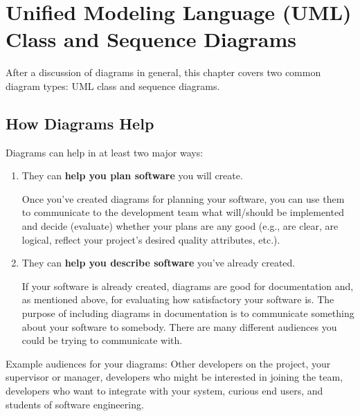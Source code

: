 \yesmargins
\chapter{Unified Modeling Language (UML) Class and Sequence Diagrams}



After a discussion of diagrams in general, this chapter covers two common diagram types: UML class and sequence diagrams.

\section{How Diagrams Help}

Diagrams can help in at least two major ways:

\begin{enumerate}
\item {
They can \textbf{help you plan software} you will create.

Once you've created diagrams for planning your software, you can use them to communicate to the development team what will/should be implemented and decide (evaluate) whether your plans are any good (e.g., are clear, are logical, reflect your project's desired quality attributes, etc.).
}
\item {
They can \textbf{help you describe software} you've already created.

\marginpar{\classDiagramDef\margindivider}\marginpar{\sequenceDiagramDef}If your software is already created, diagrams are good for documentation and, as mentioned above, for evaluating how satisfactory your software is.  The purpose of including diagrams in documentation is to communicate something about your software to somebody. There are many different audiences you could be trying to communicate with.
}
\end{enumerate}

Example audiences for your diagrams: Other developers on the project, your supervisor or manager, developers who might be interested in joining the team, developers who want to integrate with your system, curious end users, and students of software engineering.

